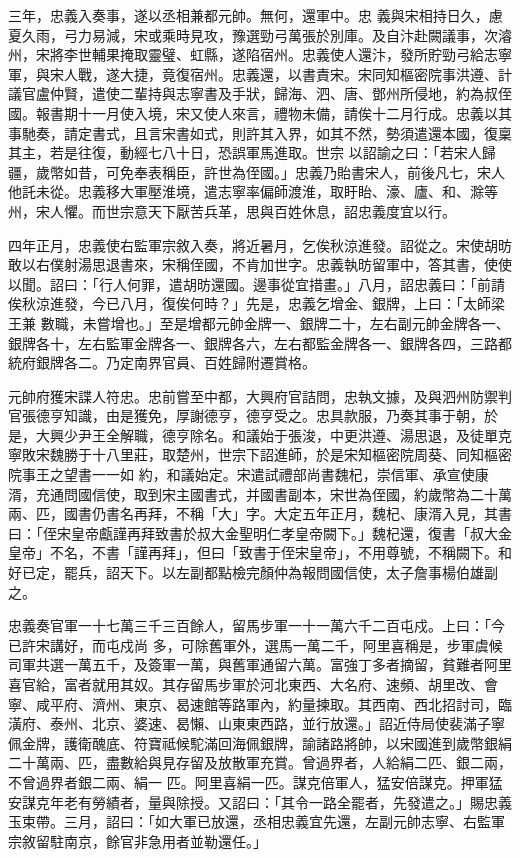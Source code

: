 \begin{pinyinscope}
 三年，忠義入奏事，遂以丞相兼都元帥。無何，還軍中。忠
 義與宋相持日久，慮夏久雨，弓力易減，宋或乘時見攻，豫選勁弓萬張於別庫。及自汴赴闕議事，次濬州，宋將李世輔果掩取靈璧、虹縣，遂陷宿州。忠義使人還汴，發所貯勁弓給志寧軍，與宋人戰，遂大捷，竟復宿州。忠義還，以書責宋。宋同知樞密院事洪遵、計議官盧仲賢，遣使二輩持與志寧書及手狀，歸海、泗、唐、鄧州所侵地，約為叔侄國。報書期十一月使入境，宋又使人來言，禮物未備，請俟十二月行成。忠義以其事馳奏，請定書式，且言宋書如式，則許其入界，如其不然，勢須遣還本國，復稟其主，若是往復，動經七八十日，恐誤軍馬進取。世宗
 以詔諭之曰：「若宋人歸疆，歲幣如昔，可免奉表稱臣，許世為侄國。」忠義乃貽書宋人，前後凡七，宋人他託未從。忠義移大軍壓淮境，遣志寧率偏師渡淮，取盱眙、濠、廬、和、滁等州，宋人懼。而世宗意天下厭苦兵革，思與百姓休息，詔忠義度宜以行。



 四年正月，忠義使右監軍宗敘入奏，將近暑月，乞俟秋涼進發。詔從之。宋使胡昉敢以右僕射湯思退書來，宋稱侄國，不肯加世字。忠義執昉留軍中，答其書，使使以聞。詔曰：「行人何罪，遣胡昉還國。邊事從宜措畫。」八月，詔忠義曰：「前請俟秋涼進發，今已八月，復俟何時？」先是，忠義乞增金、銀牌，上曰：「太師梁王兼
 數職，未嘗增也。」至是增都元帥金牌一、銀牌二十，左右副元帥金牌各一、銀牌各十，左右監軍金牌各一、銀牌各六，左右都監金牌各一、銀牌各四，三路都統府銀牌各二。乃定南界官員、百姓歸附遷賞格。



 元帥府獲宋諜人符忠。忠前嘗至中都，大興府官詰問，忠執文據，及與泗州防禦判官張德亨知識，由是獲免，厚謝德亨，德亨受之。忠具款服，乃奏其事于朝，於是，大興少尹王全解職，德亨除名。和議始于張浚，中更洪遵、湯思退，及徒單克寧敗宋魏勝于十八里莊，取楚州，世宗下詔進師，於是宋知樞密院周葵、同知樞密院事王之望書一一如
 約，和議始定。宋遣試禮部尚書魏杞，崇信軍、承宣使康湑，充通問國信使，取到宋主國書式，并國書副本，宋世為侄國，約歲幣為二十萬兩、匹，國書仍書名再拜，不稱「大」字。大定五年正月，魏杞、康湑入見，其書曰：「侄宋皇帝甗謹再拜致書於叔大金聖明仁孝皇帝闕下。」魏杞還，復書「叔大金皇帝」不名，不書「謹再拜」，但曰「致書于侄宋皇帝」，不用尊號，不稱闕下。和好已定，罷兵，詔天下。以左副都點檢完顏仲為報問國信使，太子詹事楊伯雄副之。



 忠義奏官軍一十七萬三千三百餘人，留馬步軍一十一萬六千二百屯戍。上曰：「今已許宋講好，而屯戍尚
 多，可除舊軍外，選馬一萬二千，阿里喜稱是，步軍虞候司軍共選一萬五千，及簽軍一萬，與舊軍通留六萬。富強丁多者摘留，貧難者阿里喜官給，富者就用其奴。其存留馬步軍於河北東西、大名府、速頻、胡里改、會寧、咸平府、濟州、東京、曷速館等路軍內，約量揀取。其西南、西北招討司，臨潢府、泰州、北京、婆速、曷懶、山東東西路，並行放還。」詔近侍局使裴滿子寧佩金牌，護衛醜底、符寶祗候駝滿回海佩銀牌，諭諸路將帥，以宋國進到歲幣銀絹二十萬兩、匹，盡數給與見存留及放散軍充賞。曾過界者，人給絹二匹、銀二兩，不曾過界者銀二兩、絹一
 匹。阿里喜絹一匹。謀克倍軍人，猛安倍謀克。押軍猛安謀克年老有勞績者，量與除授。又詔曰：「其令一路全罷者，先發遣之。」賜忠義玉束帶。三月，詔曰：「如大軍已放還，丞相忠義宜先還，左副元帥志寧、右監軍宗敘留駐南京，餘官非急用者並勒還任。」




\end{pinyinscope}

